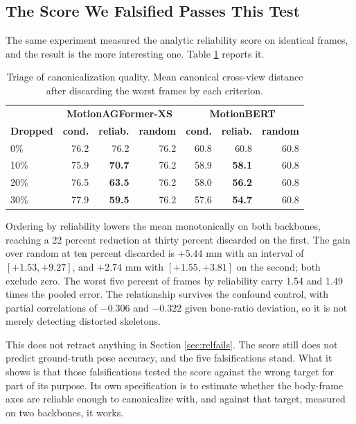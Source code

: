 \subsection{The Score We Falsified Passes This Test}

The same experiment measured the analytic reliability score on identical frames, and the result is the more interesting one. Table \ref{tab:triage} reports it.

\begin{table}[htbp]
\centering
\caption[Triage of canonicalization quality]{Triage of canonicalization quality. Mean canonical cross-view distance after discarding the worst frames by each criterion.}
\label{tab:triage}
{\fontsize{10}{12}\selectfont
\begin{tabular}{lrrrrrr}
\hline
& \multicolumn{3}{c}{\textbf{MotionAGFormer-XS}} & \multicolumn{3}{c}{\textbf{MotionBERT}} \\
\textbf{Dropped} & \textbf{cond.} & \textbf{reliab.} & \textbf{random} & \textbf{cond.} & \textbf{reliab.} & \textbf{random} \\
\hline
0\%  & 76.2 & 76.2 & 76.2 & 60.8 & 60.8 & 60.8 \\
10\% & 75.9 & \textbf{70.7} & 76.2 & 58.9 & \textbf{58.1} & 60.8 \\
20\% & 76.5 & \textbf{63.5} & 76.2 & 58.0 & \textbf{56.2} & 60.8 \\
30\% & 77.9 & \textbf{59.5} & 76.2 & 57.6 & \textbf{54.7} & 60.8 \\
\hline
\end{tabular}}
\end{table}

Ordering by reliability lowers the mean monotonically on both backbones, reaching a 22 percent reduction at thirty percent discarded on the first. The gain over random at ten percent discarded is $+5.44$ mm with an interval of $[+1.53, +9.27]$, and $+2.74$ mm with $[+1.55, +3.81]$ on the second; both exclude zero. The worst five percent of frames by reliability carry 1.54 and 1.49 times the pooled error. The relationship survives the confound control, with partial correlations of $-0.306$ and $-0.322$ given bone-ratio deviation, so it is not merely detecting distorted skeletons.

This does not retract anything in Section \ref{sec:relfails}. The score still does not predict ground-truth pose accuracy, and the five falsifications stand. What it shows is that those falsifications tested the score against the wrong target for part of its purpose. Its own specification is to estimate whether the body-frame axes are reliable enough to canonicalize with, and against that target, measured on two backbones, it works.

